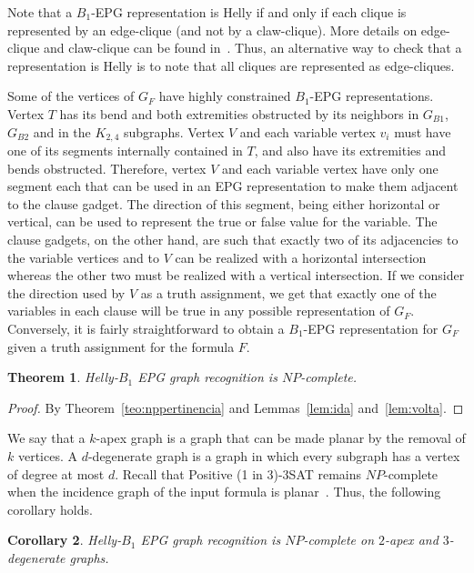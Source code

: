 \documentclass[
submission
]{dmtcs-episciences}
\newtheorem{theorem}{Theorem}
\newtheorem{corollary}[theorem]{Corollary}
\begin{document}
Note that a $B_1$-EPG representation is Helly if and only if each clique is represented by an edge-clique (and not by a claw-clique). More details on edge-clique and claw-clique can be found in~\cite{golumbic2009}. Thus, an alternative way to check that a representation is Helly is to note that all cliques are represented as edge-cliques. 

\smallskip

Some of the vertices of $G_F$ have highly constrained $B_1$-EPG representations. Vertex $T$ has its bend	and both extremities	obstructed	by its neighbors in	$G_{B1}$, $G_{B2}$ and in the $K_{2,4}$
subgraphs. Vertex $V$ and each variable vertex $v_i$ must have one of its segments internally contained in $T$, and also have its extremities and bends obstructed.  Therefore, vertex $V$ and each
variable vertex have only one segment each that can be used in an EPG
representation to make them adjacent to the clause gadget. The direction of
this segment, being either horizontal	or vertical, can be used to represent
the true or false value	for the	variable.
The clause gadgets, on the other hand, are such that exactly two of its
adjacencies to the variable vertices and to $V$ can be realized with a
horizontal intersection whereas  the other two must be realized with a
vertical intersection. If we consider the direction used by $V$ as a
truth assignment, we get that exactly one of the variables in each clause
will be	true in	any possible representation of $G_F$. Conversely, it is	fairly
straightforward to obtain a $B_1$-EPG representation for $G_F$ given a truth assignment	for
the formula $F$.

\begin{theorem}
{\sc Helly-$B_1$ EPG graph recognition} is $NP$-complete.
\end{theorem}
\begin{proof} %
By Theorem~\ref{teo:nppertinencia} and Lemmas~\ref{lem:ida} and~\ref{lem:volta}.
 \end{proof}

We say that a $k$-apex graph is a graph that can be made planar by the removal of $k$ vertices. A $d$-degenerate graph is a graph in which every subgraph has a vertex of degree at most $d$. Recall that {\sc Positive (1 in 3)-3SAT} remains $NP$-complete when the incidence graph of the input formula is planar~\cite{mulzer2008minimum}. Thus, the following corollary holds.

\begin{corollary}\label{coro:2apexAnd3degenerate}
{\sc Helly-$B_1$ EPG graph recognition} is $NP$-complete on $2$-apex and $3$-degenerate graphs.
\end{corollary}
\end{document}
